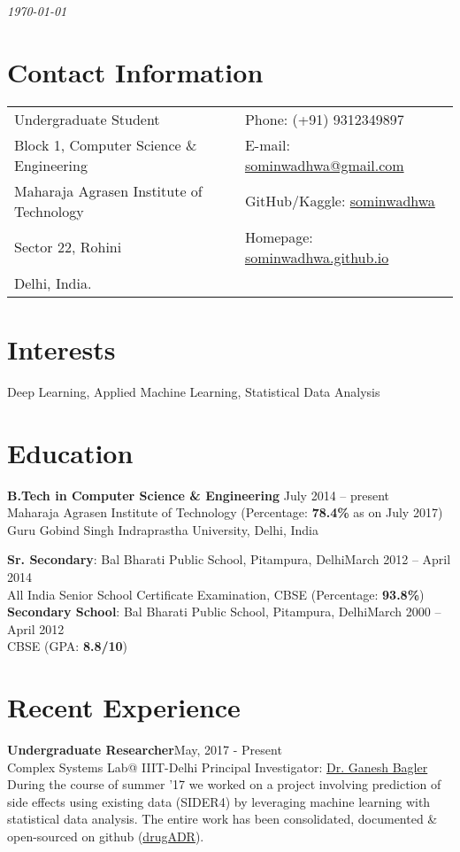 \documentclass[margin,line]{res}
\begin{document}
 \hfill {\em \today}

\begin{resume}
\section{\sc Contact Information}

\vspace{.025in}
\begin{tabular}{@{}p{3.5in}p{3in}}
Undergraduate Student             & {Phone:}  (+91) 9312349897 \\
Block 1, Computer Science \& Engineering 
 & {E-mail:}  \href{mailto:sominwadhwa@gmail.com}{\color{blue}sominwadhwa@gmail.com} \\
Maharaja Agrasen Institute of Technology & {GitHub/Kaggle:} {\href{https://github.com/sominwadhwa}{\color{blue}sominwadhwa}}\\
Sector 22, Rohini & {Homepage:} {\href{sominwadhwa.github.io/}{\color{blue}sominwadhwa.github.io}}\\
Delhi, India.
\end{tabular}

\section{\sc Interests}
Deep Learning, Applied Machine Learning, Statistical Data Analysis

\section{\sc Education}
{\bf B.Tech in Computer Science \& Engineering} \hfill July 2014 -- present\\
Maharaja Agrasen Institute of Technology \hfill(Percentage: {\bf 78.4\%} as on July 2017)\\
Guru Gobind Singh Indraprastha University, Delhi, India

{\bf Sr. Secondary}: Bal Bharati Public School, Pitampura, Delhi\hfill March 2012 -- April 2014\\
All India Senior School Certificate Examination, CBSE \hfill(Percentage: {\bf 93.8\%})\\
{\bf Secondary School}: Bal Bharati Public School, Pitampura, Delhi\hfill March 2000 -- April 2012\\
CBSE \hfill(GPA: {\bf 8.8/10})

\section{\sc Recent Experience}
{\bf Undergraduate Researcher}\hfill May, 2017 - Present\\  
Complex Systems Lab@ IIIT-Delhi \hfill Principal Investigator: {\href{https://scholar.google.co.in/citations?user=qyth_0QAAAAJ&hl=en}{\color{blue} Dr. Ganesh Bagler}}\\
During the course of summer '17 we worked on a project involving prediction of side effects using existing data (SIDER4) by leveraging machine learning with statistical data analysis. The entire work has been consolidated, documented \& open-sourced on github ({\href{https://github.com/sominwadhwa/drugADR}{\color{blue}drugADR}}).


\end{resume}
\end{document}
